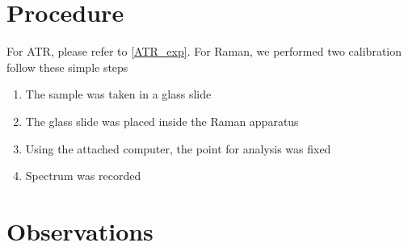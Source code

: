 \section{Procedure}
	For ATR, please refer to \autoref{ATR_exp}. For Raman, we performed two calibration follow these simple steps
	\begin{enumerate}
		\item The sample was taken in a glass slide
		\item The glass slide was placed inside the Raman apparatus
		\item Using the attached computer, the point for analysis was fixed
		\item Spectrum was recorded
	\end{enumerate}


\section{Observations}

